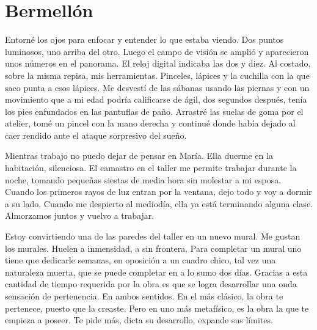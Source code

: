 \documentclass[11pt,twoside,openright,a6paper]{book}
\begin{document}
\chapter*{Bermellón}

Entorné los ojos para enfocar y entender lo que estaba viendo. Dos puntos luminosos, uno arriba del otro. Luego el campo de visión se amplió y aparecieron unos números en el panorama. El reloj digital indicaba las dos y diez. Al costado, sobre la misma repisa, mis herramientas. Pinceles, lápices y la cuchilla con la que saco punta a esos lápices. Me desvestí de las sábanas usando las piernas y con un movimiento que a mi edad podría calificarse de ágil, dos segundos después, tenía los pies enfundados en las pantuflas de paño. Arrastré las suelas de goma por el atelier, tomé un pincel con la mano derecha y continué donde había dejado al caer rendido ante el ataque sorpresivo del sueño.

Mientras trabajo no puedo dejar de pensar en María. Ella duerme en la habitación, silenciosa. El camastro en el taller me permite trabajar durante la noche, tomando pequeñas siestas de media hora sin molestar a mi esposa. Cuando los primeros rayos de luz entran por la ventana, dejo todo y voy a dormir a su lado. Cuando me despierto al mediodía, ella ya está terminando alguna clase. Almorzamos juntos y vuelvo a trabajar.

Estoy convirtiendo una de las paredes del taller en un nuevo mural. Me gustan los murales. Huelen a inmensidad, a sin frontera. Para completar un mural uno tiene que dedicarle semanas, en oposición a un cuadro chico, tal vez una naturaleza muerta, que se puede completar en a lo sumo dos días. Gracias a esta cantidad de tiempo requerida por la obra es que se logra desarrollar una onda sensación de pertenencia. En ambos sentidos. En el más clásico, la obra te pertenece, puesto que la creaste. Pero en uno más metafísico, es la obra la que te empieza a poseer. Te pide más, dicta su desarrollo, expande sus límites.
\end{document}
